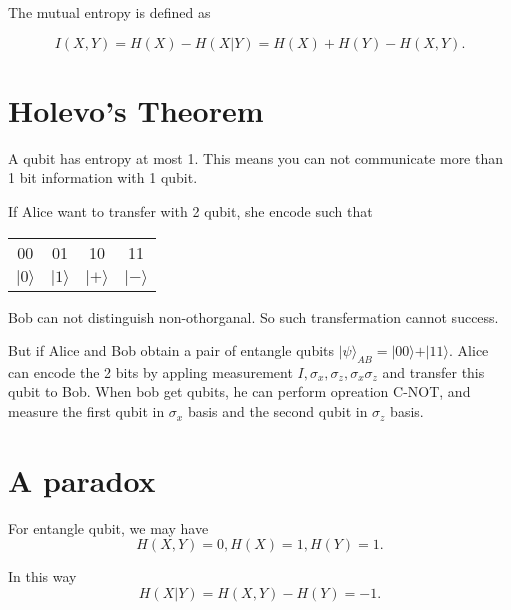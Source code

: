\documentclass{article}
\begin{document}
\begin{CJK}{UTF8}{gkai}
\begin{spacing}{1.2}
The mutual entropy is defined as 

\[I(X,Y)=H(X)-H(X|Y)=H(X)+H(Y)-H(X,Y).\]

\section{Holevo's Theorem} 

A qubit has entropy at most 1. This means you can not communicate more than 1 bit information with 1 qubit. 

If Alice want to transfer with 2 qubit, she encode such that 

\begin{center}
 	\begin{tabular}{|c|c|c|c|}
 		\cline{1-4}
 		00 & 01 & 10 & 11  \\ \cline{1-4}
 		$\vert 0 \rangle$ & $\vert 1 \rangle$ & $\vert + \rangle$ &$\vert - \rangle$  \\\cline{1-4}
 	\end{tabular}
 \end{center}

 Bob can not distinguish non-othorganal. So such transfermation cannot success.  

 But if Alice and Bob obtain a pair of entangle qubits $\vert \psi \rangle_{AB} = \vert 00 \rangle + \vert 11 \rangle.$ Alice can encode the 2 bits by appling measurement $I,\sigma_x,\sigma_z,\sigma_x \sigma_z$ and transfer this qubit to Bob. When bob get qubits, he can perform opreation C-NOT, and measure the first qubit in $\sigma_x$ basis and the second qubit in $\sigma_z$ basis. 

\section{A paradox}
 For entangle qubit, we may have \[H(X,Y)=0,H(X)=1,H(Y)=1.\]

 In this way \[H(X|Y)=H(X,Y)-H(Y)=-1.\]
\end{spacing}

\end{CJK}
\end{document}
